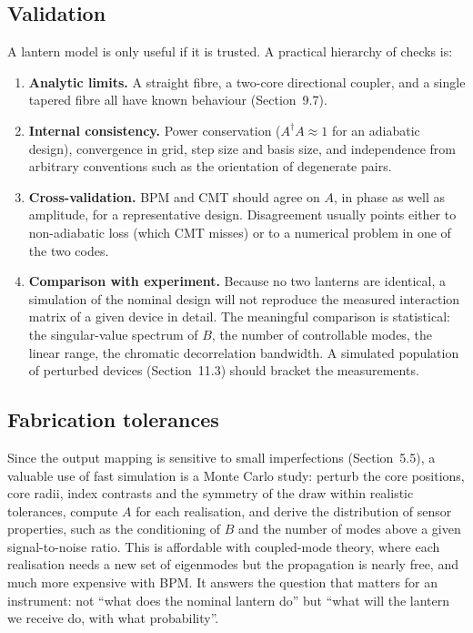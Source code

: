 \documentclass[11pt,a4paper]{article}
\begin{document}
\subsection{Validation}
A lantern model is only useful if it is trusted. A practical hierarchy of checks is:
\begin{enumerate}
\item \textbf{Analytic limits.} A straight fibre, a two-core directional coupler, and a single tapered fibre all have known behaviour (Section~9.7).
\item \textbf{Internal consistency.} Power conservation ($A^\dagger A \approx 1$ for an adiabatic design), convergence in grid, step size and basis size, and independence from arbitrary conventions such as the orientation of degenerate pairs.
\item \textbf{Cross-validation.} BPM and CMT should agree on $A$, in phase as well as amplitude, for a representative design. Disagreement usually points either to non-adiabatic loss (which CMT misses) or to a numerical problem in one of the two codes.
\item \textbf{Comparison with experiment.} Because no two lanterns are identical, a simulation of the nominal design will not reproduce the measured interaction matrix of a given device in detail. The meaningful comparison is statistical: the singular-value spectrum of $B$, the number of controllable modes, the linear range, the chromatic decorrelation bandwidth. A simulated population of perturbed devices (Section~11.3) should bracket the measurements.
\end{enumerate}

\subsection{Fabrication tolerances}
Since the output mapping is sensitive to small imperfections (Section~5.5), a valuable use of fast simulation is a Monte Carlo study: perturb the core positions, core radii, index contrasts and the symmetry of the draw within realistic tolerances, compute $A$ for each realisation, and derive the distribution of sensor properties, such as the conditioning of $B$ and the number of modes above a given signal-to-noise ratio. This is affordable with coupled-mode theory, where each realisation needs a new set of eigenmodes but the propagation is nearly free, and much more expensive with BPM. It answers the question that matters for an instrument: not ``what does the nominal lantern do'' but ``what will the lantern we receive do, with what probability''.
\end{document}
